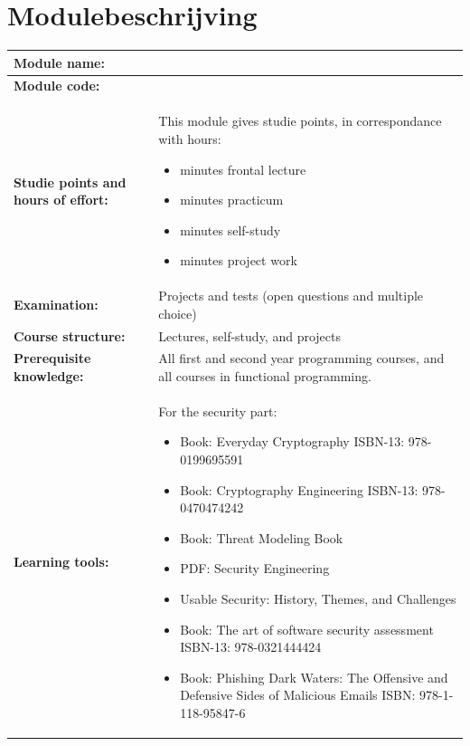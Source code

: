 \section*{Modulebeschrijving}
\begin{tabularx}{\textwidth}{|>{\columncolor{lichtGrijs}} p{}|X|}
	\hline
	\textbf{Module name:} & \modulenaam\\
	\hline
	\textbf{Module code: }& \modulecode\\
	\hline
	\textbf{Studie points \newline and hours of effort:} & This module gives \stdPunten studie points, in correspondance with \red{???} hours:
	\begin{itemize}
		\item \red{???} minutes frontal lecture
		\item \red{???} minutes practicum
		\item \red{???} minutes self-study
		\item \red{???} minutes project work
	\end{itemize} \\
	\hline
	\textbf{Examination:} & Projects and tests (open questions and multiple choice) \\
	\hline
	\textbf{Course structure:} & Lectures, self-study, and projects \\
	\hline
	\textbf{Prerequisite knowledge:}& All first and second year programming courses, and all courses in functional programming. \\
	\hline
	\textbf{Learning tools:}  &
		For the security part:
		\begin{itemize}
			\item Book: Everyday Cryptography ISBN-13: 978-0199695591
			\item Book: Cryptography Engineering ISBN-13: 978-0470474242
			\item Book: Threat Modeling Book
			\item PDF: Security Engineering
			\item Usable Security: History, Themes, and Challenges
			\item Book: The art of software security assessment ISBN-13: 978-0321444424
			\item Book: Phishing Dark Waters: The Offensive and Defensive Sides of Malicious Emails ISBN: 978-1-118-95847-6
		\end{itemize} \\
	

\end{tabularx}
